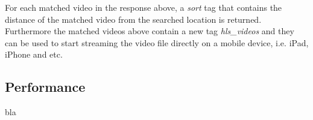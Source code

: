 For each matched video in the response above, a \textit{sort} tag that contains the distance of the matched video from the searched location is returned. Furthermore the matched videos above contain a new tag \textit{hls\_videos} and they can be used to start streaming the video file directly on a mobile device, i.e. iPad, iPhone and etc.


\subsection{Performance\label{seq:eval_perf}}
bla